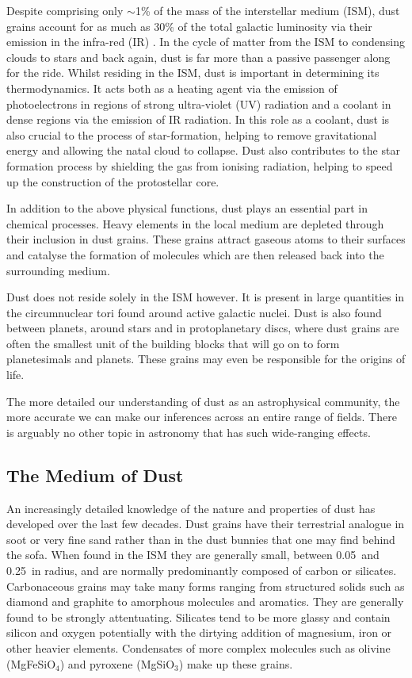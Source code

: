 Despite comprising only $\sim$1\% of the mass of the interstellar medium (ISM), dust grains account for as much as 30\% of the total galactic luminosity via their emission in the infra-red (IR) \citep{Li2003}.  In the cycle of matter from the ISM to condensing clouds to stars and back again, dust is far more than a passive passenger along for the ride.  Whilst residing in the ISM, dust is important in determining its thermodynamics.  It acts both as a heating agent via the emission of photoelectrons in regions of strong ultra-violet (UV) radiation and a coolant in dense regions via the emission of IR radiation.  In this role as a coolant, dust is also crucial to the process of star-formation, helping to remove gravitational energy and allowing the natal cloud to collapse.  Dust also contributes to the star formation process by shielding the gas from ionising radiation, helping to speed up the construction of the protostellar core. 

In addition to the above physical functions, dust plays an essential part in chemical processes.  Heavy elements in the local medium are depleted through their inclusion in dust grains.  These grains  attract gaseous atoms to their surfaces and catalyse the formation of molecules which are then released back into the surrounding medium.

Dust does not reside solely in the ISM however.  It is present in  large quantities in the circumnuclear tori found around active galactic nuclei.  Dust is also found between planets, around stars and in protoplanetary discs, where dust grains are often the smallest unit of the building blocks that will go on to form planetesimals and planets.  These grains may even be responsible for the origins of life.  

The more detailed our understanding of dust as an astrophysical community, the more accurate we can make our inferences across an entire range of  fields.  There is arguably no other topic in astronomy that has such wide-ranging effects.


\subsection{The Medium of Dust}

An increasingly detailed knowledge of the nature and properties of dust has developed over the last few decades. Dust grains have their terrestrial analogue in soot or very fine sand rather than in the dust bunnies that one may find behind the sofa.  When found in the ISM they are generally small, between 0.05\micron\ and 0.25\micron\ in radius, and are normally predominantly composed of carbon or silicates.  Carbonaceous grains may take many forms ranging from structured solids such as diamond and graphite to amorphous molecules and aromatics.  They are generally found to be strongly attentuating.  Silicates tend to be more glassy and contain silicon and oxygen potentially with the dirtying addition of magnesium, iron or other heavier elements.  Condensates of more complex molecules such as olivine (MgFeSiO$_4$) and pyroxene (MgSiO$_3$) make up these grains.  

